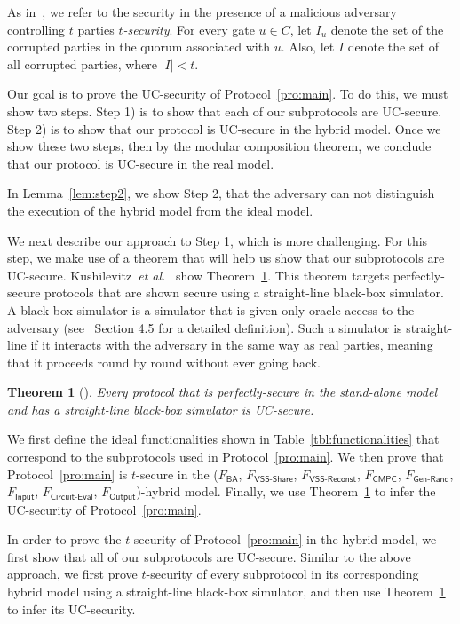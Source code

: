 \documentclass[11pt,letter]{article}
\newcommand{\etal}{\emph{et al.}}
\newcommand{\func}[1]{\mbox{$F_\textsf{#1}$}}
\theoremstyle{mytheoremstyle}
\newtheorem{theorem}{Theorem}
\begin{document}
As in~\cite{Goldreich:2004:FCV:975541}, we refer to the security in the presence of a malicious adversary controlling $t$ parties \emph{$t$-security}. For every gate $u \in C$, let $I_u$ denote the set of the corrupted parties in the quorum associated with $u$. Also, let $I$ denote the set of all corrupted parties, where $|I|<t$. 

Our goal is to prove the UC-security of Protocol~\ref{pro:main}.  To do this, we must show two steps.  Step 1) is to show that each of our subprotocols are UC-secure.  Step 2) is to show that our protocol is UC-secure in the hybrid model.  Once we show these two steps, then by the modular composition theorem, we conclude that our protocol is UC-secure in the real model.

In Lemma~\ref{lem:step2}, we show Step 2, that the adversary can not distinguish the execution of the hybrid model from the ideal model.

We next describe our approach to Step 1, which is more challenging.  For this step, we make use of a theorem that will help us show that our subprotocols are UC-secure. Kushilevitz~\etal~\cite{Kushilevitz:2010:ISP:1958016.1958032} show Theorem~\ref{thm:ucperfect}. This theorem targets perfectly-secure protocols that are shown secure using a straight-line black-box simulator. A black-box simulator is a simulator that is given only oracle access to the adversary (see~\cite{Goldreich:2000:FCB:519078} Section 4.5 for a detailed definition). Such a simulator is straight-line if it interacts with the adversary in the same way as real parties, meaning that it proceeds round by round without ever going back.

\begin{theorem}[\cite{Kushilevitz:2010:ISP:1958016.1958032}] \label{thm:ucperfect}
	Every protocol that is perfectly-secure in the stand-alone model and has a straight-line black-box simulator is UC-secure.
\end{theorem}

 We first define the ideal functionalities shown in Table~\ref{tbl:functionalities} that correspond to the subprotocols used in Protocol~\ref{pro:main}. We then prove that Protocol~\ref{pro:main} is $t$-secure in the (\func{BA}, \func{VSS-Share}, \func{VSS-Reconst}, \func{CMPC}, \func{Gen-Rand}, \func{Input}, \func{Circuit-Eval}, \func{Output})-hybrid model. Finally, we use Theorem~\ref{thm:ucperfect} to infer the UC-security of Protocol~\ref{pro:main}.

In order to prove the $t$-security of Protocol~\ref{pro:main} in the hybrid model, we first show that all of our subprotocols are UC-secure. Similar to the above approach, we first prove $t$-security of every subprotocol in its corresponding hybrid model using a straight-line black-box simulator, and then use Theorem~\ref{thm:ucperfect} to infer its UC-security.
\end{document}

